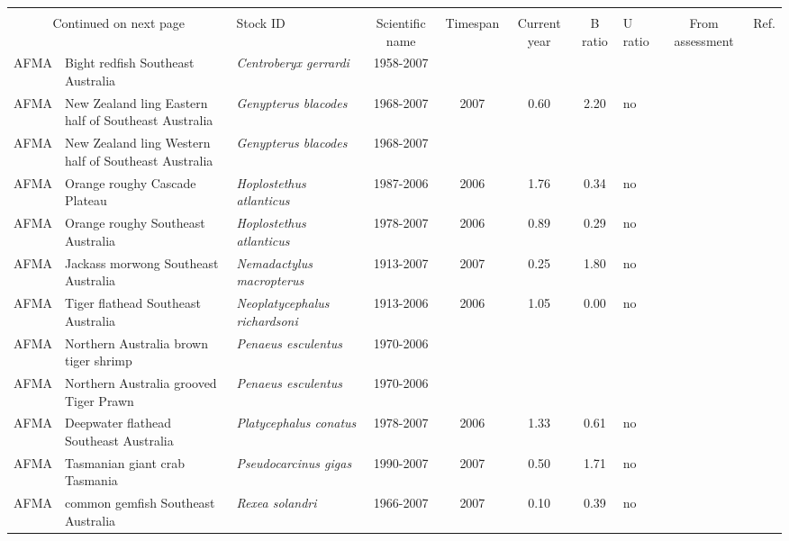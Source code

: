 \begin{longtable}{p{1.8cm}p{4cm}p{4cm}ccccp{1.9cm}c}
  \bottomrule \\ \multicolumn{2}{c}{Continued on next page} \endfoot \endlastfoot
Management & Stock ID & Scientific name & Timespan & Current year & B ratio & U ratio & From assessment & Ref. \\ \midrule \endhead
AFMA & Bight redfish Southeast Australia & \textit{Centroberyx gerrardi} & 1958-2007 &  &  &  &  & \cite{BIGHTREDDEEPFLATSE.pdf} \\ 
  AFMA & New Zealand ling Eastern half of Southeast Australia & \textit{Genypterus blacodes} & 1968-2007 & 2007 & 0.60 & 2.20 & no & \cite{NZLINGSE.pdf} \\ 
  AFMA & New Zealand ling Western half of Southeast Australia & \textit{Genypterus blacodes} & 1968-2007 &  &  &  &  & \cite{NZLINGSE.pdf} \\ 
  AFMA & Orange roughy Cascade Plateau & \textit{Hoplostethus atlanticus} & 1987-2006 & 2006 & 1.76 & 0.34 & no & \cite{CSIRO-Cascade-Plateau-Stock-Assessment-2006.pdf} \\ 
  AFMA & Orange roughy Southeast Australia & \textit{Hoplostethus atlanticus} & 1978-2007 & 2006 & 0.89 & 0.29 & no & \cite{OROUGHYSE.pdf} \\ 
  AFMA & Jackass morwong Southeast Australia & \textit{Nemadactylus macropterus} & 1913-2007 & 2007 & 0.25 & 1.80 & no & \cite{MORWONGSE.pdf} \\ 
  AFMA & Tiger flathead Southeast Australia & \textit{Neoplatycephalus richardsoni} & 1913-2006 & 2006 & 1.05 & 0.00 & no & \cite{TIGERFLATSE.pdf} \\ 
  AFMA & Northern Australia brown tiger shrimp & \textit{Penaeus esculentus} & 1970-2006 &  &  &  &  & \cite{NORTHPRAWNS.pdf} \\ 
  AFMA & Northern Australia grooved Tiger Prawn & \textit{Penaeus esculentus} & 1970-2006 &  &  &  &  & \cite{NORTHPRAWNS.pdf} \\ 
  AFMA & Deepwater flathead Southeast Australia & \textit{Platycephalus conatus} & 1978-2007 & 2006 & 1.33 & 0.61 & no & \cite{BIGHTREDDEEPFLATSE.pdf} \\ 
  AFMA & Tasmanian giant crab Tasmania & \textit{Pseudocarcinus gigas} & 1990-2007 & 2007 & 0.50 & 1.71 & no & \cite{JENSEN_TASGIANTCRAB_2008.pdf} \\ 
  AFMA & common gemfish Southeast Australia & \textit{Rexea solandri} & 1966-2007 & 2007 & 0.10 & 0.39 & no & \cite{GEMFISHSE.pdf} \\ 

\end{longtable}
